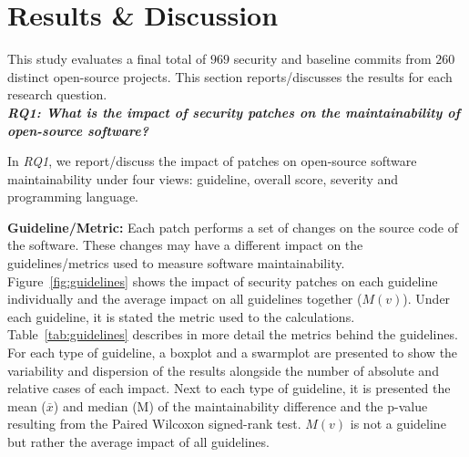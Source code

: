 \documentclass[10pt,conference]{IEEEtran}
\begin{document}
\section{Results \& Discussion}\label{sec:results}

This study evaluates a final total of $969$ security and baseline commits 
from $260$ distinct open-source projects. This section reports/discusses 
the results for each research question.
%
\\\textit{\textbf{RQ1: What is the impact of security patches on the
maintainability of open-source software?}}

In \emph{RQ1}, we report/discuss the impact of patches on open-source
software maintainability under four views: guideline, overall score, 
severity and programming language.

\textbf{Guideline/Metric:} Each patch performs a set of changes
on the source code of the software. These changes may have a different
impact on the guidelines/metrics used to measure software maintainability. 
Figure~\ref{fig:guidelines} shows the impact of security patches 
on each guideline individually and the average impact on all guidelines 
together ($M(v)$). Under each guideline, it is stated the 
metric used to the calculations. Table~\ref{tab:guidelines} describes 
in more detail the metrics behind the guidelines. 
For each type of guideline, a boxplot 
and a swarmplot are presented to show the variability and dispersion of
the results alongside the number of absolute
and relative cases of each impact. Next to each
type of guideline, it is presented the mean ($\overline{x}$) and median (M)
of the maintainability difference and the p-value resulting from the
Paired Wilcoxon signed-rank test. $M(v)$ is not a guideline but rather the 
average impact of all guidelines.
\end{document}

